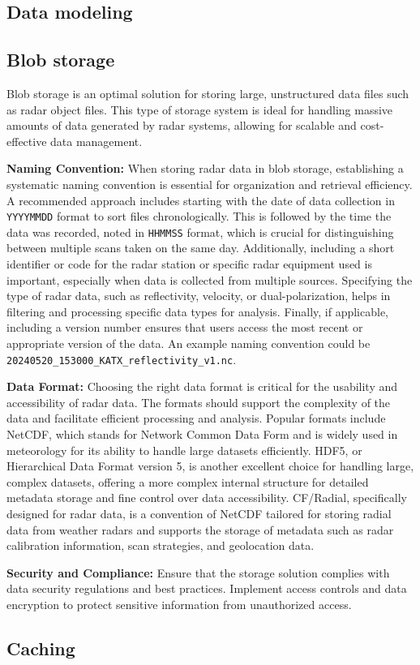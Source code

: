 
\subsection{Data modeling}

\subsection{Blob storage}

Blob storage is an optimal solution for storing large, unstructured data files
such as radar object files. This type of storage system is ideal for handling
massive amounts of data generated by radar systems, allowing for scalable and
cost-effective data management.

\textbf{Naming Convention:}
When storing radar data in blob storage, establishing a systematic naming
convention is essential for organization and retrieval efficiency. A recommended
approach includes starting with the date of data collection in \texttt{YYYYMMDD}
format to sort files chronologically. This is followed by the time the data was
recorded, noted in \texttt{HHMMSS} format, which is crucial for distinguishing
between multiple scans taken on the same day. Additionally, including a short
identifier or code for the radar station or specific radar equipment used is
important, especially when data is collected from multiple sources. Specifying
the type of radar data, such as reflectivity, velocity, or dual-polarization,
helps in filtering and processing specific data types for analysis. Finally, if
applicable, including a version number ensures that users access the most recent
or appropriate version of the data. An example naming convention could be
\texttt{20240520\_153000\_KATX\_reflectivity\_v1.nc}.

\textbf{Data Format:}
Choosing the right data format is critical for the usability and accessibility
of radar data. The formats should support the complexity of the data and
facilitate efficient processing and analysis. Popular formats include NetCDF,
which stands for Network Common Data Form and is widely used in meteorology for
its ability to handle large datasets efficiently. HDF5, or Hierarchical Data
Format version 5, is another excellent choice for handling large, complex
datasets, offering a more complex internal structure for detailed metadata
storage and fine control over data accessibility. CF/Radial, specifically
designed for radar data, is a convention of NetCDF tailored for storing radial
data from weather radars and supports the storage of metadata such as radar
calibration information, scan strategies, and geolocation data.

\textbf{Security and Compliance:}
Ensure that the storage solution complies with data security regulations and
best practices. Implement access controls and data encryption to protect
sensitive information from unauthorized access.

\subsection{Caching}

